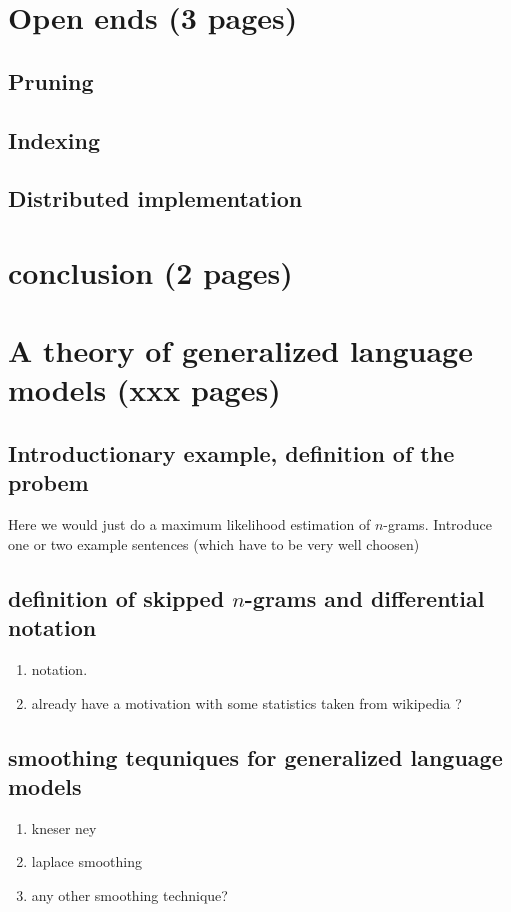 \documentclass[•]{book}
\begin{document}
\chapter{Open ends (3 pages)}
\section{Pruning}
\section{Indexing}
\section{Distributed implementation}
\chapter{conclusion (2 pages)}



\chapter{A theory of generalized language models (xxx pages)}
\section{Introductionary example, definition of the probem}
Here we would just do a maximum likelihood estimation of $n$-grams. 
Introduce one or two example sentences (which have to be very well choosen)
\section{definition of skipped $n$-grams and differential notation}
\begin{enumerate}
\item notation. 
\item already have a motivation with some statistics taken from wikipedia ? 
\end{enumerate}
\section{smoothing tequniques for generalized language models}
\begin{enumerate}
\item kneser ney
\item laplace smoothing
\item any other smoothing technique?
\end{enumerate}
\end{document}
